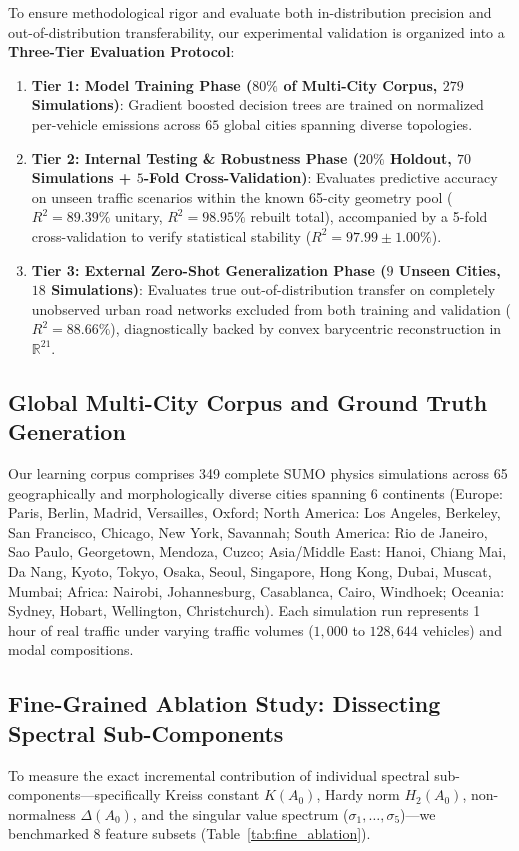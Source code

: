 \documentclass[lettersize,journal]{IEEEtran}
\begin{document}
To ensure methodological rigor and evaluate both in-distribution precision and out-of-distribution transferability, our experimental validation is organized into a \textbf{Three-Tier Evaluation Protocol}:
\begin{enumerate}
    \item \textbf{Tier 1: Model Training Phase ($80\%$ of Multi-City Corpus, $279$ Simulations)}: Gradient boosted decision trees are trained on normalized per-vehicle emissions across $65$ global cities spanning diverse topologies.
    \item \textbf{Tier 2: Internal Testing \& Robustness Phase ($20\%$ Holdout, $70$ Simulations + $5$-Fold Cross-Validation)}: Evaluates predictive accuracy on unseen traffic scenarios within the known 65-city geometry pool ($R^2 = 89.39\%$ unitary, $R^2 = 98.95\%$ rebuilt total), accompanied by a 5-fold cross-validation to verify statistical stability ($R^2 = 97.99 \pm 1.00\%$).
    \item \textbf{Tier 3: External Zero-Shot Generalization Phase ($9$ Unseen Cities, $18$ Simulations)}: Evaluates true out-of-distribution transfer on completely unobserved urban road networks excluded from both training and validation ($R^2 = 88.66\%$), diagnostically backed by convex barycentric reconstruction in $\mathbb{R}^{21}$.
\end{enumerate}

\subsection{Global Multi-City Corpus and Ground Truth Generation}
Our learning corpus comprises 349 complete SUMO physics simulations across 65 geographically and morphologically diverse cities spanning 6 continents (Europe: Paris, Berlin, Madrid, Versailles, Oxford; North America: Los Angeles, Berkeley, San Francisco, Chicago, New York, Savannah; South America: Rio de Janeiro, Sao Paulo, Georgetown, Mendoza, Cuzco; Asia/Middle East: Hanoi, Chiang Mai, Da Nang, Kyoto, Tokyo, Osaka, Seoul, Singapore, Hong Kong, Dubai, Muscat, Mumbai; Africa: Nairobi, Johannesburg, Casablanca, Cairo, Windhoek; Oceania: Sydney, Hobart, Wellington, Christchurch). Each simulation run represents 1 hour of real traffic under varying traffic volumes ($1,000$ to $128,644$ vehicles) and modal compositions.

\subsection{Fine-Grained Ablation Study: Dissecting Spectral Sub-Components}
To measure the exact incremental contribution of individual spectral sub-components—specifically Kreiss constant $K(A_0)$, Hardy norm $H_2(A_0)$, non-normalness $\Delta(A_0)$, and the singular value spectrum ($\sigma_1, \dots, \sigma_5$)—we benchmarked 8 feature subsets (Table~\ref{tab:fine_ablation}).
\end{document}
